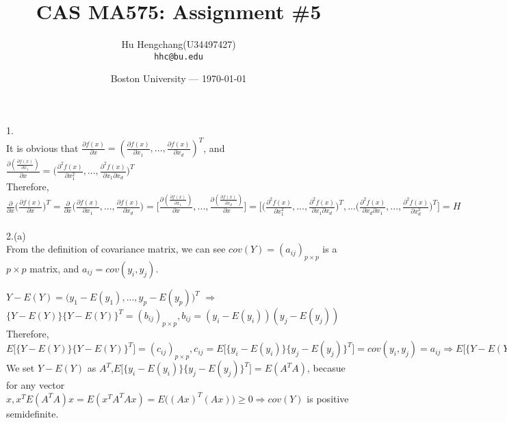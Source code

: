 \documentclass[fleqn]{article}
\title{CAS MA575: Assignment \#5} %
\author{Hu Hengchang(U34497427)\\ \texttt{hhc@bu.edu}} %
\date{Boston University --- \today} %
\begin{document}
\maketitle %




1.\\

It is obvious that $\frac{\partial f(x)}{\partial x} = (\frac{\partial f(x)}{\partial x_1},..., \frac{\partial f(x)}{\partial x_d})^T$, and $\frac{\partial (\frac{\partial f(x)}{\partial x_1})}{\partial x} = \big(\frac{\partial^2 f(x)}{\partial x_1^2},..., \frac{\partial^2 f(x)}{\partial x_1 \partial x_d}\big)^T$\\

Therefore, $\frac{\partial }{\partial x} \Big(\frac{\partial f(x)}{\partial x}\Big)^T = \frac{\partial }{\partial x} \Big(\frac{\partial f(x)}{\partial x_1},..., \frac{\partial f(x)}{\partial x_d}\Big) = \big[\frac{\partial (\frac{\partial f(x)}{\partial x_1})}{\partial x},...,\frac{\partial (\frac{\partial f(x)}{\partial x_d})}{\partial x} \big] = \big[\big(\frac{\partial^2 f(x)}{\partial x_1^2},..., \frac{\partial^2 f(x)}{\partial x_1 \partial x_d}\big)^T,...\big(\frac{\partial^2 f(x)}{\partial x_d \partial x_1},..., \frac{\partial^2 f(x)}{\partial x_d^2}\big)^T\big] = H$\\
\\



2.(a)\\

From the definition of covariance matrix, we can see $cov(Y) = (a_{ij})_{p \times p}$ is a $p \times p$ matrix, and $a_{ij} = cov(y_i, y_j)$.

$Y - E(Y) = \Big(y_1 - E(y_1),...,y_p - E(y_p)\Big)^T$ $\Rightarrow$ $\{Y - E(Y)\}  \{Y - E(Y)\}^T = (b_{ij})_{p \times p}, b_{ij} = (y_i - E(y_i))(y_j - E(y_j))$\\

Therefore, $E\big[\{Y - E(Y)\}  \{Y - E(Y)\}^T\big] = (c_{ij})_{p \times p}, c_{ij} = E\big[\{y_i - E(y_i)\}  \{y_j - E(y_j)\}^T\big] = cov(y_i, y_j) = a_{ij} \Rightarrow E\big[\{Y - E(Y)\}  \{Y - E(Y)\}^T\big] = cov(Y)$\\

We set $Y - E(Y)$ as $A^T$,$ E\big[\{y_i - E(y_i)\}  \{y_j - E(y_j)\}^T\big] = E(A^T A)$, becasue for any vector $x, x^T E(A^T A) x = E(x^T A^T A x) = E\big((Ax)^T (Ax)\big) \geq 0 \Rightarrow cov(Y)$ is positive semidefinite. \\
\end{document}
